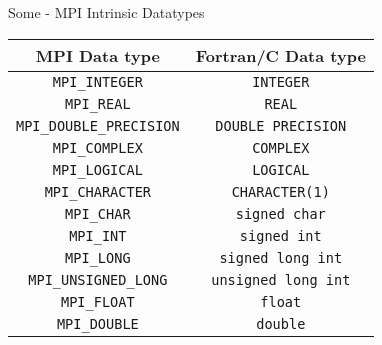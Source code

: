 \documentclass[aspectratio=43]{beamer}
\begin{document}
\begin{frame}[fragile]{Some - MPI Intrinsic Datatypes}
\begin{center}
\begin{tabular}{|c||c|}
    \hline
    \color{cscsblue}\textbf{MPI Data type} & \color{cscsbrown}\textbf{Fortran/C Data type} \\\hline\hline
    \verb+MPI_INTEGER+ & \verb+INTEGER+ \\\hline
    \verb+MPI_REAL+ & \verb+REAL+ \\\hline
    \verb+MPI_DOUBLE_PRECISION+ & \verb+DOUBLE PRECISION+ \\\hline
    \verb+MPI_COMPLEX+ & \verb+COMPLEX+ \\\hline
    \verb+MPI_LOGICAL+ & \verb+LOGICAL+ \\\hline
    \verb+MPI_CHARACTER+ & \verb+CHARACTER(1)+ \\\hline\hline
    \verb+MPI_CHAR+ & \verb+signed char+\\\hline
    \verb+MPI_INT+ & \verb+signed int+\\\hline
    \verb+MPI_LONG+ & \verb+signed long int+\\\hline
    \verb+MPI_UNSIGNED_LONG+ & \verb+unsigned long int+\\\hline
    \verb+MPI_FLOAT+ & \verb+float+\\\hline
    \verb+MPI_DOUBLE+ & \verb+double+\\\hline
\end{tabular}
\end{center}
\end{frame}
\end{document}
